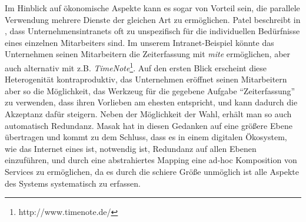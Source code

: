 Im Hinblick auf ökonomische Aspekte kann es sogar von Vorteil sein, die parallele Verwendung mehrere Dienste der gleichen Art zu ermöglichen. Patel beschreibt in \cite[S.29]{pl-depintra}, dass Unternehmensintranets oft zu unspezifisch für die individuellen Bedürfnisse eines einzelnen Mitarbeiters sind. Im unserem Intranet-Beispiel könnte das Unternehmen seinen Mitarbeitern die Zeiterfassung mit \emph{mite} ermöglichen, aber auch alternativ mit z.B. \emph{TimeNote}\footnote{http://www.timenote.de/}. Auf den ersten Blick erscheint diese Heterogenität kontraproduktiv, das Unternehmen eröffnet seinen Mitarbeitern aber so die Möglichkeit, das Werkzeug für die gegebene Aufgabe "`Zeiterfassung"' zu verwenden, dass ihren  Vorlieben am ehesten entspricht, und kann dadurch die Akzeptanz dafür steigern. Neben der Möglichkeit der Wahl, erhält man so auch automatisch Redundanz. Masak hat in \cite[S.236ff]{mkdigioe} diesen Gedanken auf eine größere Ebene übertragen und kommt zu dem Schluss, dass es in einem digitalen Ökosystem, wie das Internet eines ist, notwendig ist, Redundanz auf allen Ebenen einzuführen, und durch eine abstrahiertes Mapping eine ad-hoc Komposition von Services zu ermöglichen, da es durch die schiere Größe unmöglich ist alle Aspekte des Systems systematisch zu erfassen.
